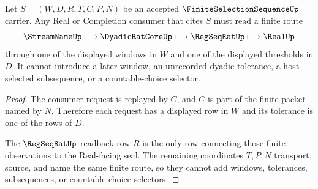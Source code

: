 \begin{theorem}
\label{thm:finite-selection-sequence-window-exhaustion}
Let $S=(W,D,R,T,C,P,N)$ be an accepted $\FiniteSelectionSequenceUp$ carrier. Any Real or Completion consumer that cites $S$ must read a finite route
$$
\StreamNameUp \longmapsto \DyadicRatCoreUp \longmapsto \RegSeqRatUp \longmapsto \RealUp
$$
through one of the displayed windows in $W$ and one of the displayed thresholds in $D$. It cannot introduce a later window, an unrecorded dyadic tolerance, a host-selected subsequence, or a countable-choice selector.
\end{theorem}
\begin{proof}
The consumer request is replayed by $C$, and $C$ is part of the finite packet named by $N$. Therefore each request has a displayed row in $W$ and its tolerance is one of the rows of $D$.

The $\RegSeqRatUp$ readback row $R$ is the only row connecting those finite observations to the Real-facing seal. The remaining coordinates $T,P,N$ transport, source, and name the same finite route, so they cannot add windows, tolerances, subsequences, or countable-choice selectors.
\end{proof}




